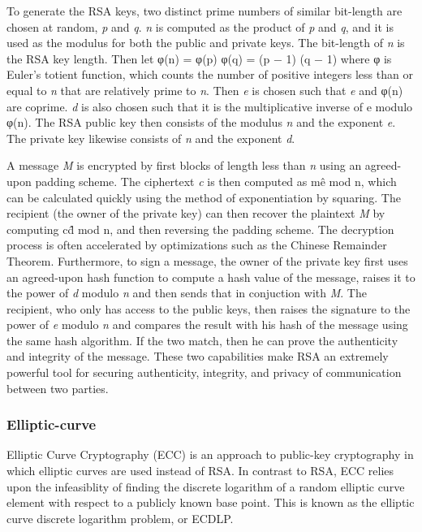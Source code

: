 \documentclass[journal]{IEEEtran}
\begin{document}
To generate the RSA keys, two distinct prime numbers of similar bit-length are chosen at random, \textit{p} and \textit{q}. \textit{n} is computed as the product of \textit{p} and \textit{q}, and it is used as the modulus for both the public and private keys. The bit-length of \textit{n} is the RSA key length. Then let φ(n)\; =\; φ(p) φ(q)\; =\; (p − 1) (q − 1)\; where φ is Euler's totient function, which counts the number of positive integers less than or equal to \textit{n} that are relatively prime to \textit{n}. Then \textit{e} is chosen such that \textit{e} and φ(n) are coprime. \textit{d} is also chosen such that it is the multiplicative inverse of e modulo φ(n). The RSA public key then consists of the modulus \textit{n} and the exponent \textit{e}. The private key likewise consists of \textit{n} and the exponent \textit{d}.

A message \textit{M} is encrypted by first blocks of length less than \textit{n} using an agreed-upon padding scheme. The ciphertext \textit{c} is then computed as m\^e mod n, which can be calculated quickly using the method of exponentiation by squaring. The recipient (the owner of the private key) can then recover the plaintext \textit{M} by computing c\^d mod n, and then reversing the padding scheme. The decryption process is often accelerated by optimizations such as the Chinese Remainder Theorem. Furthermore, to sign a message, the owner of the private key first uses an agreed-upon hash function to compute a hash value of the message, raises it to the power of \textit{d} modulo \textit{n} and then sends that in conjuction with \textit{M}. The recipient, who only has access to the public keys, then raises the signature to the power of \textit{e} modulo \textit{n} and compares the result with his hash of the message using the same hash algorithm. If the two match, then he can prove the authenticity and integrity of the message. These two capabilities make RSA an extremely powerful tool for securing authenticity, integrity, and privacy of communication between two parties.

\subsubsection{Elliptic-curve}

Elliptic Curve Cryptography (ECC) is an approach to public-key cryptography in which elliptic curves are used instead of RSA. In contrast to RSA, ECC relies upon the infeasiblity of finding the discrete logarithm of a random elliptic curve element with respect to a publicly known base point. This is known as the elliptic curve discrete logarithm problem, or ECDLP.
\end{document}
